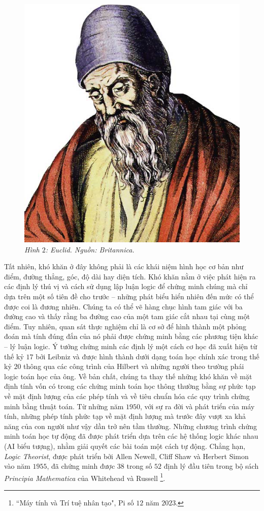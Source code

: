 \begin{multicols}{2}
\begin{figure}[H]
		\includegraphics[width= 0.8\linewidth]{Euclid.jpg}
		\caption{\small\textit{\color{timhieukhoahoc}Hình $2$: Euclid. Nguồn: Britannica.}}
		\vspace*{-5pt}
	\end{figure}
	Tất nhiên, khó khăn ở đây không phải là các khái niệm hình học cơ bản như điểm, đường thẳng, góc, độ dài hay diện tích. Khó khăn nằm ở việc phát hiện ra các định lý thú vị và cách sử dụng lập luận logic để chứng minh chúng mà chỉ dựa trên một số tiên đề cho trước -- những phát biểu hiển nhiên đến mức có thể được coi là đương nhiên. Chúng ta có thể vẽ hàng chục hình tam giác với ba đường cao và thấy rằng ba đường cao của một tam giác cắt nhau tại cùng một điểm. Tuy nhiên, quan sát thực nghiệm chỉ là cơ sở để hình thành một phỏng đoán mà tính đúng đắn của nó phải được chứng minh bằng các phương tiện khác -- lý luận logic. 
	\vskip 0.1cm
	Ý tưởng chứng minh các định lý một cách cơ học đã xuất hiện từ thế kỷ $17$ bởi Leibniz và được hình thành dưới dạng toán học chính xác trong thế kỷ $20$ thông qua các công trình của Hilbert và những người theo trường phái logic toán học của ông. Về bản chất, chúng ta thay thế những khó khăn về mặt định tính vốn có trong các chứng minh toán học thông thường bằng sự phức tạp về mặt định lượng của các phép tính và về tiêu chuẩn hóa các quy trình chứng minh bằng thuật toán. 
	\vskip 0.1cm
	Từ những năm $1950$, với sự ra đời và phát triển của máy tính, những phép tính phức tạp về mặt định lượng mà trước đây vượt xa khả năng của con người như vậy dần trở nên tầm thường. Những chương trình chứng minh toán học tự động đã được phát triển dựa trên các hệ thống logic khác nhau (AI biểu tượng), nhằm giải quyết các bài toán một cách tự động. Chẳng hạn, \textit{Logic Theorist}, được phát triển bởi Allen Newell, Cliff Shaw và Herbert Simon vào năm $1955$, đã chứng minh được $38$ trong số $52$ định lý đầu tiên trong bộ sách \textit{Principia Mathematica} của Whitehead và Russell \footnote[2]{\color{timhieukhoahoc}``Máy tính và Trí tuệ nhân tạo", Pi số $12$ năm $2023$.}. 

\end{multicols}
